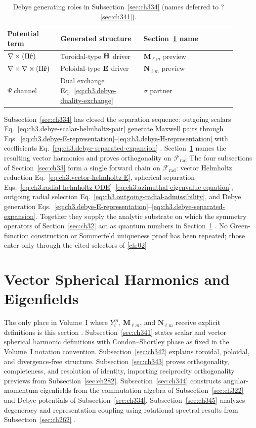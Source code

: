\begin{table}[t]
\centering
\caption{Debye generating roles in Subsection~\ref{sec:ch334} (names deferred to ?\ref{sec:ch341}).}
\label{tab:ch3.334-debye-roles}
\small
\begin{tabular}{@{}p{0.20\linewidth}p{0.34\linewidth}p{0.38\linewidth}@{}}
\toprule
Potential term & Generated structure & Section~\ref{sec:ch34} name \\
\midrule
\(\nabla\times(\Pi\hat{\mathbf{r}})\) &
Toroidal-type \(\mathbf{H}\) driver &
\(\mathbf{M}_{\ell m}\) preview \\
\addlinespace
\(\nabla\times\nabla\times(\Pi\hat{\mathbf{r}})\) &
Poloidal-type \(\mathbf{E}\) driver &
\(\mathbf{N}_{\ell m}\) preview \\
\addlinespace
\(\Psi\) channel &
Dual exchange Eq.~\eqref{eq:ch3.debye-duality-exchange} &
\(\sigma\) partner \\
\bottomrule
\end{tabular}
\end{table}
Subsection~\ref{sec:ch334} has closed the separation sequence: outgoing scalars
Eq.~\eqref{eq:ch3.debye-scalar-helmholtz-pair} generate Maxwell pairs through
Eqs.~\eqref{eq:ch3.debye-E-representation}--\eqref{eq:ch3.debye-H-representation} with coefficients
Eq.~\eqref{eq:ch3.debye-separated-expansion} . Section~\ref{sec:ch34}
names the resulting vector harmonics and proves orthogonality on \(\mathcal{F}_{\mathrm{rad}}\)
The four subsections of Section~\ref{sec:ch33} form a single forward chain on \(\mathcal{F}_{\mathrm{rad}}\):
vector Helmholtz reduction Eq.~\eqref{eq:ch3.vector-helmholtz-E}, spherical separation
Eqs.~\eqref{eq:ch3.radial-helmholtz-ODE}--\eqref{eq:ch3.azimuthal-eigenvalue-equation}, outgoing radial
selection Eq.~\eqref{eq:ch3.outgoing-radial-admissibility}, and Debye generation
Eqs.~\eqref{eq:ch3.debye-E-representation}--\eqref{eq:ch3.debye-separated-expansion}. Together they supply the
analytic substrate on which the symmetry operators of Section~\ref{sec:ch32} act as quantum numbers in
Section~\ref{sec:ch34} . No Green-function construction or Sommerfeld
uniqueness proof has been repeated; those enter only through the cited selectors of \ref{ch:02}
\section{Vector Spherical Harmonics and Eigenfields}
\label{sec:ch34}
The only place in Volume~I where
\(Y_\ell^m\), \(\mathbf{M}_{\ell m}\), and \(\mathbf{N}_{\ell m}\) receive explicit definitions is this section
\cite{stratton1941}. Subsection~\ref{sec:ch341} states scalar and vector spherical
harmonic definitions with Condon--Shortley phase as fixed in the Volume~I notation convention. Subsection~\ref{sec:ch342}
explains toroidal, poloidal, and divergence-free structure. Subsection~\ref{sec:ch343} proves orthogonality,
completeness, and resolution of identity, importing reciprocity orthogonality previews from
Subsection~\ref{sec:ch282}. Subsection~\ref{sec:ch344} constructs angular-momentum eigenfields from the
commutation algebra of Subsection~\ref{sec:ch322} and Debye potentials of Subsection~\ref{sec:ch334}.
Subsection~\ref{sec:ch345} analyzes degeneracy and representation coupling using rotational spectral results
from Subsection~\ref{sec:ch262} \cite{jackson1999}.
